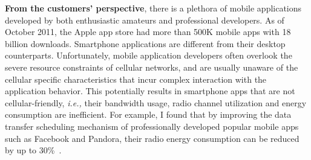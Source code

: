 \documentclass[10pt]{article}
\newcommand{\ie}{\emph{i.e.,}\xspace}
\begin{document}
\begin{small}
\textbf{From the customers' perspective}, there is a plethora of mobile applications developed by both enthusiastic amateurs and professional developers. As of October 2011, the Apple app store had more than 500K mobile apps with 18 billion downloads. Smartphone applications are different from their desktop counterparts. Unfortunately, mobile application developers often overlook the severe resource constraints of cellular networks, and are usually unaware of the cellular specific characteristics that incur complex interaction with the application behavior. This potentially results in smartphone apps that are not cellular-friendly, \ie their bandwidth usage, radio channel utilization and energy consumption are inefficient. For example, I found that by improving the data transfer scheduling mechanism of professionally developed popular mobile apps such as Facebook and Pandora, their radio energy consumption can be reduced by up to 30\%~\cite{qian_periodic}.




\end{small}
\end{document}
